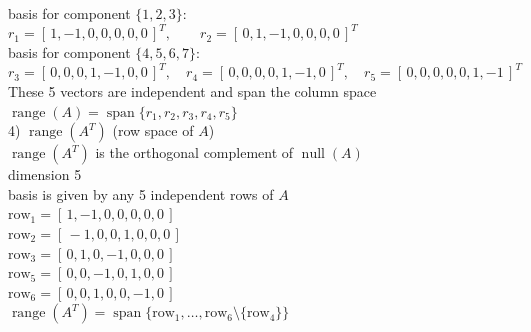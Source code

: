 \documentclass{article}
\begin{document}
{{\begin{enumerate}
\begin{enumerate}[a.]
\\basis for component $\{1,2,3\}$:  $r_1 = [\,1,-1,0,0,0,0,0\,]^T,\qquad r_2 = [\,0,1,-1,0,0,0,0\,]^T$
\\basis for component $\{4,5,6,7\}$: $r_3 = [\,0,0,0,1,-1,0,0\,]^T,\quad r_4 = [\,0,0,0,0,1,-1,0\,]^T,\quad r_5 = [\,0,0,0,0,0,1,-1\,]^T$
\\These 5 vectors are independent and span the column space $\operatorname{range}(A)=\operatorname{span}\{r_1,r_2,r_3,r_4,r_5\}$
\\4) $\displaystyle \operatorname{range}(A^T)$ (row space of $A$)
\\$\operatorname{range}(A^T)$ is the orthogonal complement of $\operatorname{null}(A)$
\\dimension 5
\\basis is given by any 5 independent rows of $A$
\\$\text{row}_1=[\,1,-1,0,0,0,0,0\,]$
\\$\text{row}_2=[\,-1,0,0,1,0,0,0\,]$
\\$\text{row}_3=[\,0,1,0,-1,0,0,0\,]$
\\$\text{row}_5=[\,0,0,-1,0,1,0,0\,]$
\\$\text{row}_6=[\,0,0,1,0,0,-1,0\,]$
\\$\operatorname{range}(A^T)=\operatorname{span}\{\text{row}_1,\dots,\text{row}_6\setminus\{\text{row}_4\}\}$
\\

\end{enumerate}



\end{enumerate}}}
\end{document}
